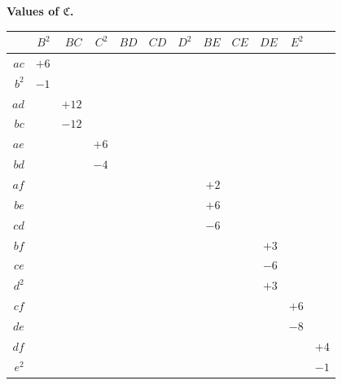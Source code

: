 \documentclass[11pt,a4paper]{article}
\theoremstyle{definition}
\begin{document}
\begin{center}
\renewcommand{\arraystretch}{1.15}
\textbf{Values of $\mathfrak{C}$.}
\begin{tabular}{r|rrrrrrrrrr}
& $B^{2}$ & $BC$ & $C^{2}$ & $BD$ & $CD$ & $D^{2}$ & $BE$ & $CE$ & $DE$ & $E^{2}$ \\
\hline
$ac$ & $+6$ \\
$b^{2}$ & $-1$ \\
$ad$ & & $+12$ \\
$bc$ & & $-12$ \\
$ae$ & & & $+6$ \\
$bd$ & & & $-4$ \\
$af$ & & & & & & & $+2$ \\
$be$ & & & & & & & $+6$ \\
$cd$ & & & & & & & $-6$ \\
$bf$ & & & & & & & & & $+3$ \\
$ce$ & & & & & & & & & $-6$ \\
$d^{2}$ & & & & & & & & & $+3$ \\
$cf$ & & & & & & & & & & $+6$ \\
$de$ & & & & & & & & & & $-8$ \\
$df$ & & & & & & & & & & & $+4$ \\
$e^{2}$ & & & & & & & & & & & $-1$
\end{tabular}
\end{center}
\end{document}
